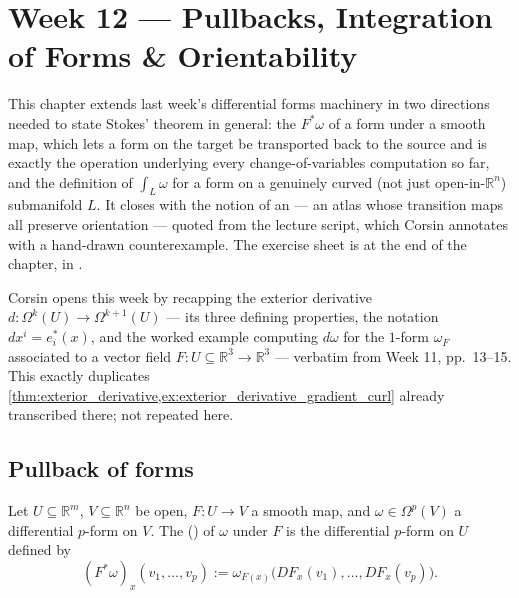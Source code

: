 \chapter{Week 12 --- Pullbacks, Integration of Forms \& Orientability}
\label{ch:week12}

This chapter extends last week's differential forms machinery in two directions needed to
state Stokes' theorem in general: the  $F^*\omega$ of a form under a smooth
map, which lets a form on the target be transported back to the source and is exactly the
operation underlying every change-of-variables computation so far, and the definition of
$\int_L \omega$ for a form on a genuinely curved (not just open-in-$\mathbb{R}^n$) submanifold
$L$. It closes with the notion of an  --- an atlas whose
transition maps all preserve orientation --- quoted from the lecture script, which Corsin
annotates with a hand-drawn counterexample. The exercise sheet is at the end of the chapter,
in .

\begin{ainote}
Corsin opens this week by recapping the exterior derivative $d : \Omega^k(U) \to
\Omega^{k+1}(U)$ --- its three defining properties, the notation $dx^i = e_i^*(x)$, and the
worked example computing $d\omega$ for the $1$-form $\omega_F$ associated to a vector field
$F : U \subseteq \mathbb{R}^3 \to \mathbb{R}^3$ --- verbatim from Week 11, pp.\ 13--15.
This exactly duplicates \cref{thm:exterior_derivative,ex:exterior_derivative_gradient_curl}
already transcribed there; not repeated here.
\end{ainote}

\section{Pullback of forms}
\label{sec:pullback_of_forms}

\begin{definition}
\label{def:pullback_of_forms}
Let $U \subseteq \mathbb{R}^m$, $V \subseteq \mathbb{R}^n$ be open, $F : U \to V$ a smooth
map, and $\omega \in \Omega^p(V)$ a differential $p$-form on $V$. The 
() of $\omega$ under $F$ is the differential $p$-form on $U$
defined by
\[(F^*\omega)_x(v_1,\ldots,v_p) := \omega_{F(x)}\big(DF_x(v_1),\ldots,DF_x(v_p)\big).\]
\end{definition}

